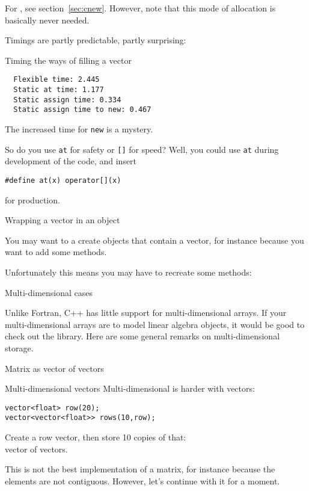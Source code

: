 For , see section~\ref{sec:cnew}. However, note that
this mode of allocation is basically never needed.

Timings are partly predictable, partly surprising:
\begin{block}{Timing the ways of filling a vector}
  \label{sl:vector-extend-time}
\begin{lstlisting}
  Flexible time: 2.445
  Static at time: 1.177
  Static assign time: 0.334
  Static assign time to new: 0.467
\end{lstlisting}
\end{block}

The increased time for \lstinline{new} is a mystery.

So do you use \lstinline{at} for safety or \lstinline{[]} for speed? Well, you could
use \lstinline{at} during development of the code, and insert
\begin{lstlisting}
#define at(x) operator[](x)
\end{lstlisting}
for production.

 {Wrapping a vector in an object}

You may want to a create objects that contain a vector, for instance
because you want to add some methods.
%

Unfortunately this means you may have to recreate some methods:
%

 {Multi-dimensional cases}

Unlike Fortran, C++ has little support for multi-dimensional
arrays. If your multi-dimensional arrays are to model linear algebra
objects, it would be good to check out the 
library. Here are some general remarks on multi-dimensional storage.

 {Matrix as vector of vectors}

\begin{block}{Multi-dimensional vectors}
  \label{sl:multi-vector}
  Multi-dimensional is harder with vectors:
\begin{lstlisting}
vector<float> row(20);
vector<vector<float>> rows(10,row);
\end{lstlisting}
Create a row vector, then store 10 copies of that:\\
vector of vectors.
\end{block}

This is not the best implementation of a matrix, for instance because
the elements are not contiguous. However, let's continue with it for a moment.

